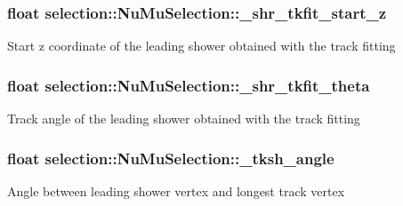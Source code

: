 \subsubsection[{\texorpdfstring{\+\_\+shr\+\_\+tkfit\+\_\+start\+\_\+z}{_shr_tkfit_start_z}}]{\setlength{\rightskip}{0pt plus 5cm}float selection\+::\+Nu\+Mu\+Selection\+::\+\_\+shr\+\_\+tkfit\+\_\+start\+\_\+z\hspace{0.3cm}{\ttfamily [private]}}\hypertarget{classselection_1_1NuMuSelection_a82f756e0a512e9b2ab45a0d2061d2ec3}{}\label{classselection_1_1NuMuSelection_a82f756e0a512e9b2ab45a0d2061d2ec3}
Start z coordinate of the leading shower obtained with the track fitting 
\subsubsection[{\texorpdfstring{\+\_\+shr\+\_\+tkfit\+\_\+theta}{_shr_tkfit_theta}}]{\setlength{\rightskip}{0pt plus 5cm}float selection\+::\+Nu\+Mu\+Selection\+::\+\_\+shr\+\_\+tkfit\+\_\+theta\hspace{0.3cm}{\ttfamily [private]}}\hypertarget{classselection_1_1NuMuSelection_a8a3b5a7f7bc6fa4a59fbc36bfbf5a835}{}\label{classselection_1_1NuMuSelection_a8a3b5a7f7bc6fa4a59fbc36bfbf5a835}
Track angle of the leading shower obtained with the track fitting 
\subsubsection[{\texorpdfstring{\+\_\+tksh\+\_\+angle}{_tksh_angle}}]{\setlength{\rightskip}{0pt plus 5cm}float selection\+::\+Nu\+Mu\+Selection\+::\+\_\+tksh\+\_\+angle\hspace{0.3cm}{\ttfamily [private]}}\hypertarget{classselection_1_1NuMuSelection_a129f335453ed7ff4678f2e388ce17575}{}\label{classselection_1_1NuMuSelection_a129f335453ed7ff4678f2e388ce17575}
Angle between leading shower vertex and longest track vertex 
